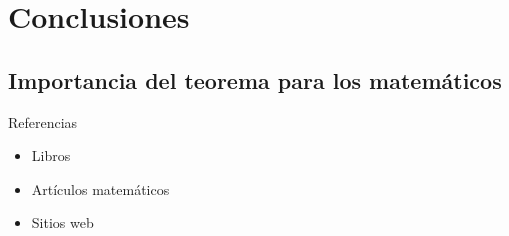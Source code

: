 \documentclass[spanish,utf8]{beamer}
\theoremstyle{definition}
\begin{document}
\begin{frame}{\insertsection}\transblindsvertical

\end{frame}

\section{Conclusiones}
\subsection{Importancia del teorema para los matemáticos}

\begin{frame}[allowframebreaks]{Referencias}\transblindsvertical
\begin{itemize}
	\item Libros
	\nocite{*}
	\printbibliography[heading=none,keyword=book]
	\item Artículos matemáticos
	\printbibliography[heading=none,keyword=paper]
	\item Sitios web
	\printbibliography[heading=none,keyword=online]
\end{itemize}
\end{frame}
\end{document}
